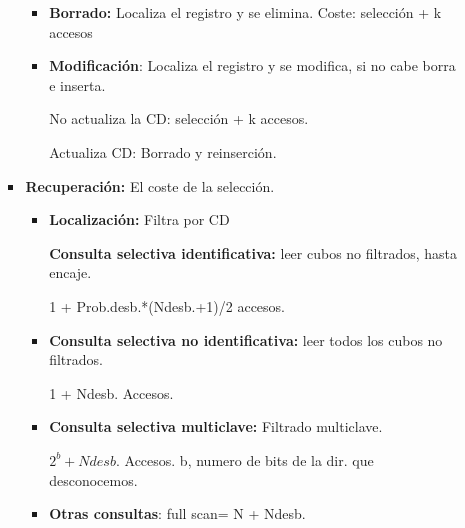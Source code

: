 \documentclass[12pt, twoside, openright]{report} %
\begin{document}
\begin{itemize}
\begin{itemize}
\begin{itemize}
\begin{itemize}
        \item \textbf{Borrado:} Localiza el registro y se elimina. Coste:
          selección + k accesos
          
        \item \textbf{Modificación}: Localiza el registro y se modifica, si
          no cabe borra e inserta.
          

         
		  
            No actualiza la CD: selección + k accesos.
           
			
            Actualiza CD: Borrado y reinserción.
          
			
        \end{itemize}
      \item \textbf{Recuperación:} El coste de la selección.
        

        \begin{itemize}
        \item \textbf{Localización:} Filtra por CD
          

         
		  
            \textbf{Consulta selectiva identificativa:} leer cubos no
            filtrados, hasta encaje.
            
			

            
			
              1 + Prob.desb.*(Ndesb.+1)/2 accesos.
             
			  
          \item
            
            \textbf{Consulta selectiva no identificativa:} leer todos
            los cubos no filtrados.
            

            
			
              1 + Ndesb. Accesos.
           
			  
          \item
            
            \textbf{Consulta selectiva multiclave:} Filtrado multiclave.
            

            
			
              $2^b+Ndesb.$ Accesos. b, numero de bits de la dir. que
              desconocemos.
              
			  
          \item
            
            \textbf{Otras consultas}: full scan= N + Ndesb.
            

\end{itemize}
\end{itemize}
\end{itemize}
\end{itemize}
\end{document}
